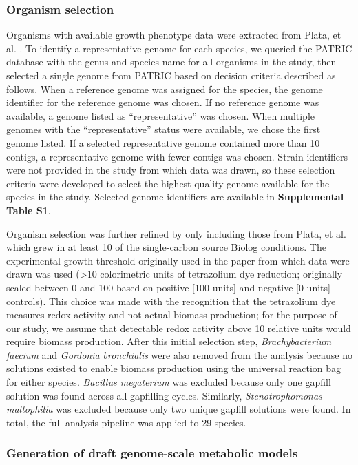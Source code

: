 \documentclass[11pt,twocolumn,notitlepage,openany,twoside]{book}
\begin{document}
\begin{refsection}
\subsubsection{Organism selection}

Organisms with available growth phenotype data were extracted from Plata, et al. \cite{Plata2015-bc}. To identify a representative genome for each species, we queried the PATRIC database \cite{Wattam2017-tk} with the genus and species name for all organisms in the study, then selected a single genome from PATRIC based on decision criteria described as follows. When a reference genome was assigned for the species, the genome identifier for the reference genome was chosen. If no reference genome was available, a genome listed as “representative” was chosen. When multiple genomes with the “representative” status were available, we chose the first genome listed. If a selected representative genome contained more than 10 contigs, a representative genome with fewer contigs was chosen. Strain identifiers were not provided in the study from which data was drawn, so these selection criteria were developed to select the highest-quality genome available for the species in the study. Selected genome identifiers are available in \textbf{Supplemental Table S1}.

Organism selection was further refined by only including those from Plata, et al. which grew in at least 10 of the single-carbon source Biolog conditions. The experimental growth threshold originally used in the paper from which data were drawn was used (>10 colorimetric units of tetrazolium dye reduction; originally scaled between 0 and 100 based on positive [100 units] and negative [0 units] controls). This choice was made with the recognition that the tetrazolium dye measures redox activity and not actual biomass production; for the purpose of our study, we assume that detectable redox activity above 10 relative units would require biomass production. After this initial selection step, \textit{Brachybacterium faecium} and \textit{Gordonia bronchialis} were also removed from the analysis because no solutions existed to enable biomass production using the universal reaction bag for either species. \textit{Bacillus megaterium} was excluded because only one gapfill solution was found across all gapfilling cycles. Similarly, \textit{Stenotrophomonas maltophilia} was excluded because only two unique gapfill solutions were found. In total, the full analysis pipeline was applied to 29 species.

\subsubsection{Generation of draft genome-scale metabolic models}


\end{refsection}
\end{document}
